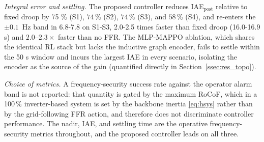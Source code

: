 \documentclass[lettersize,journal]{IEEEtran}
\begin{document}
\emph{Integral error and settling.}
The proposed controller reduces IAE$_{\mathrm{post}}$ relative to fixed droop by 75 \% (S1), $74$\,\% (S2), $74$\,\% (S3), and $58$\,\% (S4), and re-enters the $\pm0.1$~Hz band in 6.8-7.8 on S1-S3, 2.0-2.5 times faster than fixed droop (16.0-16.9 s) and $2.0$--$2.3\times$ faster than no FFR. The MLP-MAPPO ablation, which shares the identical RL stack but lacks the inductive graph encoder, fails to settle within the 50 s window and incurs the largest IAE in every scenario, isolating the encoder as the source of the gain (quantified directly in Section~\ref{ssec:res_topo}).
 
\emph{Choice of metrics.}
A frequency-security success rate against the operator alarm band is not reported: that quantity is gated by the maximum RoCoF, which in a 100\,\% inverter-based system is set by the backbone inertia \eqref{eq:hsys} rather than by the grid-following FFR action, and therefore does not discriminate controller performance. The nadir, IAE, and settling time are the operative frequency-security metrics throughout, and the proposed controller leads on all three.
 
\begin{table}[!t]
\caption{Severity scaling on the generation-trip family
($5$ seeds per cell).}
\label{tab:severity}
\centering
\footnotesize
{}
\end{table}
 
\end{document}
